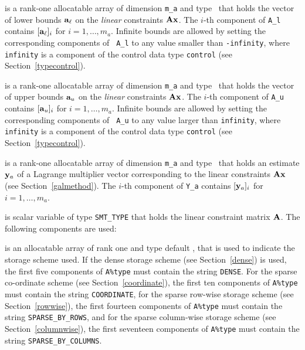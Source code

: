 \documentclass{galahad}
\begin{document}
\begin{description}
 is a rank-one allocatable array of dimension {\tt m\_a}
and type \realdp\ that holds the vector of lower bounds
${\mathbf{a}}_\ell$ on the {\em linear} constraints ${\mathbf{A}}{\mathbf{x}}$. The $i$-th component of
{\tt A\_l} contains $[{\mathbf{a}}_\ell]_i$ for $i = 1, \ldots , m_a$.  Infinite
bounds are allowed by setting the corresponding components of {\tt
  A\_l} to any value smaller than {\tt -infinity}, where {\tt
  infinity} is a component of the control data type {\tt control} (see
Section~\ref{typecontrol}).

  is a rank-one allocatable array of dimension {\tt m\_a}
and type \realdp\ that holds the vector of upper bounds
${\mathbf{a}}_u$ on the {\em linear} constraints ${\mathbf{A}}{\mathbf{x}}$. The $i$-th component of
{\tt A\_u} contains $[{\mathbf{a}}_u]_i$ for $i = 1, \ldots , m_a$.  Infinite
bounds are allowed by setting the corresponding components of {\tt
  A\_u} to any value larger than {\tt infinity}, where {\tt
  infinity} is a component of the control data type {\tt control} (see
Section~\ref{typecontrol}).

 is a rank-one allocatable array of dimension {\tt m\_a} and type 
\realdp\ that holds an estimate ${\mathbf{y}}_a$ of a Lagrange
multiplier vector corresponding to the linear constraints ${\mathbf{A}}{\mathbf{x}}$ (see Section~\ref{galmethod}).
The $i$-th component of {\tt Y\_a} contains $[{\mathbf{y}}_a]_{i}$ for $i = 1,
\ldots , m_a$.


 is scalar variable of type {\tt SMT\_TYPE} 
that holds the linear constraint matrix ${\mathbf{A}}$. The following components
are used:

\begin{description}

 is an allocatable array of rank one and type default 
\character, that
is used to indicate the storage scheme used. If the dense storage scheme 
(see Section~\ref{dense}) is used, 
the first five components of {\tt A\%type} must contain the
string {\tt DENSE}.
For the sparse co-ordinate scheme (see Section~\ref{coordinate}), 
the first ten components of {\tt A\%type} must contain the
string {\tt COORDINATE},  
for the sparse row-wise storage scheme (see Section~\ref{rowwise}),
the first fourteen components of {\tt A\%type} must contain the
string {\tt SPARSE\_BY\_ROWS},
and for the sparse column-wise storage scheme (see Section~\ref{columnwise}),
the first seventeen components of {\tt A\%type} must contain the
string {\tt SPARSE\_BY\_COLUMNS}.


\end{description}
\end{description}
\end{document}
